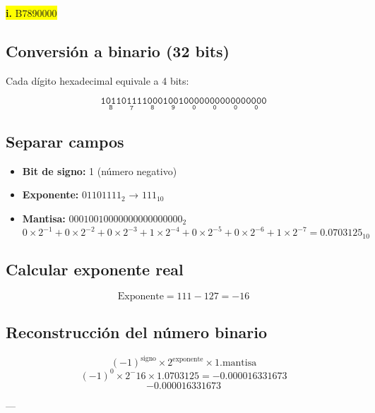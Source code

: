 \documentclass[a4paper,12pt]{article}
\begin{document}
	\begin{center}
		\colorbox{yellow}{\textbf{i.} B7890000}
		\subsection*{Conversión a binario (32 bits)}
		Cada dígito hexadecimal equivale a 4 bits:
		
		\[
		\mathtt{
			\underset{\text{B}}{\boxed{\mathtt{1011}}}
			\underset{\text{7}}{\boxed{\mathtt{0111}}}
			\underset{\text{8}}{\boxed{\mathtt{1000}}}
			\underset{\text{9}}{\boxed{\mathtt{1001}}}
			\underset{\text{0}}{\boxed{\mathtt{0000}}}
			\underset{\text{0}}{\boxed{\mathtt{0000}}}
			\underset{\text{0}}{\boxed{\mathtt{0000}}}
			\underset{\text{0}}{\boxed{\mathtt{0000}}}
		}	
		\]
		
		\subsection*{Separar campos}
		
		\begin{itemize}
			\item \textbf{Bit de signo:} 1 (número negativo)
			\item \textbf{Exponente:} $01101111_2$ → $111_{10}$
			\item \textbf{Mantisa:} $00010010000000000000000_2$ 
			\[
			0\times2^{-1} + 0\times2^{-2} + 0\times2^{-3} + 1\times2^{-4} + 0\times2^{-5} + 0\times2^{-6} + 1\times2^{-7} = 0.0703125_{10}
			\]
		\end{itemize}
		
		\subsection*{Calcular exponente real}
		
		\[
		\text{Exponente} = 111 -127 = -16
		\]
		
		
		
		\subsection*{Reconstrucción del número binario}	
		\[
		(-1)^{\text{signo}} \times 2^{\text{exponente}} \times 1.\text{mantisa}
		\]
		\[
		(-1)^0 \times 2^-16 \times 1.0703125 = -0.000016331673
		\]
		\vspace{1em}
		\[
		\boxed{-0.000016331673}
		\]
		
		---
	\end{center}
\end{document}

